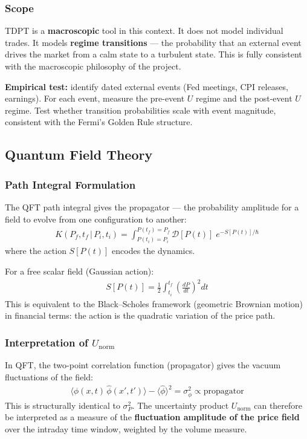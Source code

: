 \documentclass[preprint,12pt]{elsarticle}
\begin{document}
\subsubsection{Scope}

TDPT is a \textbf{macroscopic} tool in this context. It does not model individual trades. It models \textbf{regime transitions} — the probability that an external event drives the market from a calm state to a turbulent state. This is fully consistent with the macroscopic philosophy of the project.

\textbf{Empirical test:} identify dated external events (Fed meetings, CPI releases, earnings). For each event, measure the pre-event $U$ regime and the post-event $U$ regime. Test whether transition probabilities scale with event magnitude, consistent with the Fermi's Golden Rule structure.

\subsection{Quantum Field Theory}

\subsubsection{Path Integral Formulation}

The QFT path integral gives the propagator --- the probability amplitude for a field to evolve from one configuration to another:
\begin{align}
    K(P_f, t_f\,|\, P_i, t_i) = \int_{P(t_i)=P_i}^{P(t_f)=P_f} \mathcal{D}[P(t)]\; e^{-S[P(t)]/\hbar}
\end{align}
where the action $S[P(t)]$ encodes the dynamics.

For a free scalar field (Gaussian action):
\begin{align}
    S[P(t)] = \frac{1}{2} \int_{t_i}^{t_f} \left(\frac{dP}{dt}\right)^2 dt
\end{align}
This is equivalent to the Black--Scholes framework (geometric Brownian motion) in financial terms: the action is the quadratic variation of the price path.

\subsubsection{Interpretation of $U_\mathrm{norm}$}

In QFT, the two-point correlation function (propagator) gives the vacuum fluctuations of the field:
\begin{align}
    \langle \hat{\phi}(x,t)\, \hat{\phi}(x',t') \rangle - \langle \hat{\phi} \rangle^2 = \sigma^2_\phi \propto \text{propagator}
\end{align}
This is structurally identical to $\sigma_P^2$. The uncertainty product $U_\mathrm{norm}$ can therefore be interpreted as a measure of the \textbf{fluctuation amplitude of the price field} over the intraday time window, weighted by the volume measure.
\end{document}
